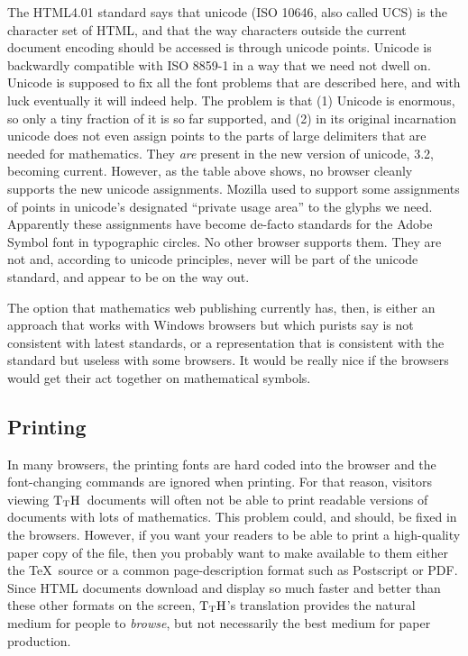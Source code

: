 \documentclass[12pt]{article}
\def\TtH{$\rm{}T_TH$}
\begin{document}
The HTML4.01 standard says that unicode (ISO 10646, also called UCS) is
the character set of HTML, and that the way characters outside the
current document encoding should be accessed is through unicode
points. Unicode is backwardly compatible with ISO 8859-1 in a way that
we need not dwell on. Unicode is supposed to fix all the font problems
that are described here, and with luck eventually it will indeed
help. The problem is that (1) Unicode is enormous, so only a tiny
fraction of it is so far supported, and (2) in its original incarnation
unicode does not even assign points to the parts of large delimiters
that are needed for mathematics. They \emph{are} present in the new
version of unicode, 3.2, becoming current. However, as the
table above shows, no browser cleanly supports the new unicode
assignments. Mozilla used to support some assignments of points in
unicode's designated ``private usage area'' to the glyphs we
need. Apparently these assignments have become de-facto standards for
the Adobe Symbol font in typographic circles. No other browser
supports them. They are not and, according to unicode principles,
never will be part of the unicode standard, and appear to be on the
way out.

The option that mathematics web publishing currently has, then, is
 either an approach that works with Windows browsers but which purists
 say is not consistent with latest standards, or a representation that
 is consistent with the standard but useless with some browsers. It
would be really nice if the browsers would get their act together on
mathematical symbols.

\subsection{Printing}
\label{exploder}

In many browsers, the printing fonts are hard coded into the browser
and the font-changing commands are ignored when printing. For that
reason, visitors viewing \TtH\ documents will often not be able to
print readable versions of documents with lots of mathematics. This
problem could, and should, be fixed in the browsers. However, if you
want your readers to be able to print a high-quality paper copy of the
file, then you probably want to make available to them either the
\TeX\ source or a common page-description format such as Postscript or
PDF. Since HTML documents download and display so much faster and
better than these other formats on the screen, \TtH's translation
provides the natural medium for people to {\it browse}, but not
necessarily the best medium for paper production.
\end{document}
